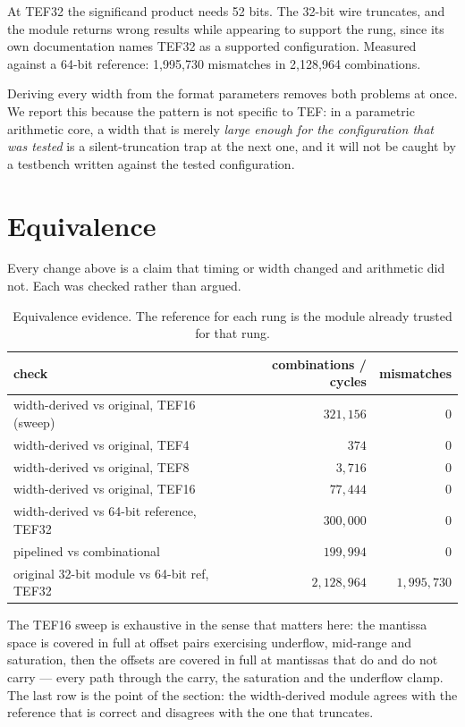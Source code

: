 \documentclass[11pt]{article}
\theoremstyle{definition}
\begin{document}
At TEF32 the significand product needs 52 bits. The 32-bit wire truncates, and
the module returns wrong results while appearing to support the rung, since its
own documentation names TEF32 as a supported configuration. Measured against a
64-bit reference: 1{,}995{,}730 mismatches in 2{,}128{,}964 combinations.

Deriving every width from the format parameters removes both problems at once. We
report this because the pattern is not specific to TEF: in a parametric
arithmetic core, a width that is merely \emph{large enough for the configuration
that was tested} is a silent-truncation trap at the next one, and it will not be
caught by a testbench written against the tested configuration.

\section{Equivalence}\label{sec:equiv}

Every change above is a claim that timing or width changed and arithmetic did
not. Each was checked rather than argued.

\begin{table}[t]\centering
\caption{Equivalence evidence. The reference for each rung is the module already
trusted for that rung.}
\label{tab:equiv}
\begin{tabular}{lrr}
\toprule
check & combinations / cycles & mismatches \\
\midrule
width-derived vs original, TEF16 (sweep)      & $321{,}156$   & $0$ \\
width-derived vs original, TEF4               & $374$         & $0$ \\
width-derived vs original, TEF8               & $3{,}716$     & $0$ \\
width-derived vs original, TEF16              & $77{,}444$    & $0$ \\
width-derived vs 64-bit reference, TEF32      & $300{,}000$   & $0$ \\
pipelined vs combinational                     & $199{,}994$   & $0$ \\
\midrule
original 32-bit module vs 64-bit ref, TEF32   & $2{,}128{,}964$ & $1{,}995{,}730$ \\
\bottomrule
\end{tabular}
\end{table}

The TEF16 sweep is exhaustive in the sense that matters here: the mantissa space
is covered in full at offset pairs exercising underflow, mid-range and
saturation, then the offsets are covered in full at mantissas that do and do not
carry --- every path through the carry, the saturation and the underflow clamp.
The last row is the point of the section: the width-derived module agrees with
the reference that is correct and disagrees with the one that truncates.
\end{document}
